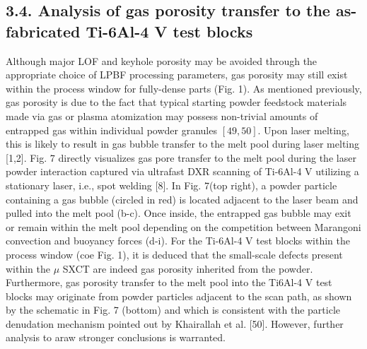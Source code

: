 \documentclass[10pt]{article}
\begin{document}
\subsection*{3.4. Analysis of gas porosity transfer to the as-fabricated Ti-6Al-4 V test blocks}
Although major LOF and keyhole porosity may be avoided through the appropriate choice of LPBF processing parameters, gas porosity may still exist within the process window for fully-dense parts (Fig. 1). As mentioned previously, gas porosity is due to the fact that typical starting powder feedstock materials made via gas or plasma atomization may possess non-trivial amounts of entrapped gas within individual powder granules $[49,50]$. Upon laser melting, this is likely to result in gas bubble transfer to the melt pool during laser melting [1,2]. Fig. 7 directly visualizes gas pore transfer to the melt pool during the laser powder interaction captured via ultrafast DXR scanning of Ti-6Al-4 V utilizing a stationary laser, i.e., spot welding [8]. In Fig. 7(top right), a powder particle containing a gas bubble (circled in red) is located adjacent to the laser beam and pulled into the melt pool (b-c). Once inside, the entrapped gas bubble may exit or remain within the melt pool depending on the competition between Marangoni convection and buoyancy forces (d-i). For the Ti-6Al-4 V test blocks within the process window (coe Fig. 1), it is deduced that the small-scale defects present within the $\mu$ SXCT are indeed gas porosity inherited from the powder. Furthermore, gas porosity transfer to the melt pool into the Ti6Al-4 V test blocks may originate from powder particles adjacent to the scan path, as shown by the schematic in Fig. 7 (bottom) and which is consistent with the particle denudation mechanism pointed out by Khairallah et al. [50]. However, further analysis to araw stronger conclusions is warranted.
\end{document}
